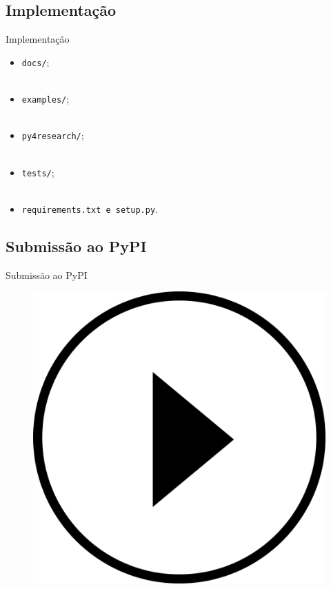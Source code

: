 \subsection{Implementação}
\label{ss.implementation}

\begin{frame}{Implementação}
	\justify
	\begin{itemize}
		\item<1> \texttt{docs/};
		\\~\\
		\item<2> \texttt{examples/};
		\\~\\
		\item<3> \texttt{py4research/};
		\\~\\
		\item<4> \texttt{tests/};
		\\~\\
		\item<5> \texttt{requirements.txt e setup.py}.
	\end{itemize}
\end{frame}

\subsection{Submissão ao PyPI}
\label{ss.pypi_submission}

\begin{frame}{Submissão ao PyPI}
\end{frame}

\begin{frame}{}
	\begin{figure}
		\centering
		\includegraphics[scale=0.125]{figs/video_play.png}
	\end{figure}
\end{frame}

